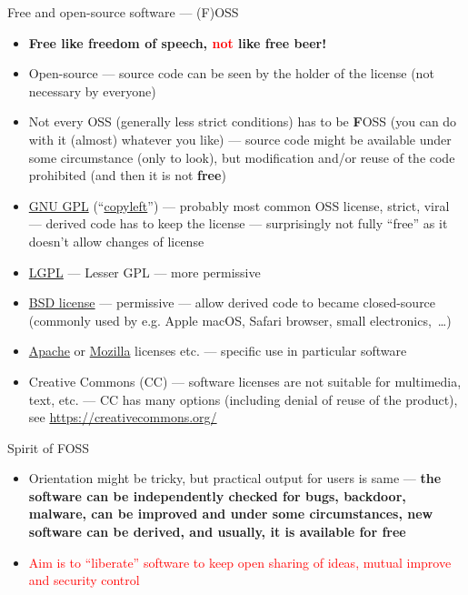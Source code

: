 \documentclass[compress, ucs, xelatex, 11pt, xcolor=svgnames, aspectratio=169,
	hyperref={
		bookmarks=true,
		unicode=true,
		colorlinks=true,
		pdftitle={Linux, command line and MetaCentrum},
		plainpages=false,
		pdfauthor={Vojtech Zeisek},
		pdfsubject={Course about use of Linux command line, writing shell scripts and using MetaCentrum of CESNET},
		pdfcreator={XeLaTeX},
		pdfkeywords={Linux, GNU, BASH, shell, command line, MetaCentrum},
		linkcolor=DarkRed, %
		anchorcolor=DarkBlue, %
		citecolor=Indigo, %
		filecolor=NavyBlue, %
		menucolor=DarkMagenta, %
		urlcolor=DarkBlue, %
		pdftex},
	url={hyphens, lowtilde} %
	]{beamer}
\renewcommand{\alert}[1]{\textcolor{red}{#1}}
\begin{document}
\begin{frame}[allowframebreaks]{Free and open-source software --- (F)OSS}
	\begin{itemize}
		\item \textbf{Free like freedom of speech, \alert{not} like free beer!}
		\item Open-source --- source code can be seen by the holder of the license (not necessary by everyone)
		\item Not every OSS (generally less strict conditions) has to be \textbf{F}OSS (you can do with it (almost) whatever you like) --- source code might be available under some circumstance (only to look), but modification and/or reuse of the code prohibited (and then it is not \textbf{free})
		\item \href{https://www.gnu.org/licenses/gpl-3.0.html}{GNU GPL} (\enquote{\href{https://www.gnu.org/copyleft/}{copyleft}}) --- probably most common OSS license, strict, viral --- derived code has to keep the license --- surprisingly not fully \enquote{free} as it doesn't allow changes of license
		\item \href{https://www.gnu.org/licenses/lgpl-3.0.en.html}{LGPL} --- Lesser GPL --- more permissive
		\item \href{https://en.wikipedia.org/wiki/BSD_licenses}{BSD license} --- permissive --- allow derived code to became closed-source (commonly used by e.g. Apple macOS, Safari browser, small electronics,~\ldots)
		\item \href{https://www.apache.org/licenses/}{Apache} or \href{https://www.mozilla.org/MPL/}{Mozilla} licenses etc. --- specific use in particular software
		\item Creative Commons (CC) --- software licenses are not suitable for multimedia, text, etc. --- CC has many options (including denial of reuse of the product), see \url{https://creativecommons.org/}
	\end{itemize}
	\begin{block}{Spirit of FOSS}
		\begin{itemize}
			\item Orientation might be tricky, but practical output for users is same --- \textbf{the software can be independently checked for bugs, backdoor, malware, can be improved and under some circumstances, new software can be derived, and usually, it is available for free}
			\item \alert{Aim is to \enquote{liberate} software to keep open sharing of ideas, mutual improve and security control}
			\begin{itemize}

\end{itemize}
\end{itemize}
\end{block}
\end{frame}
\end{document}

